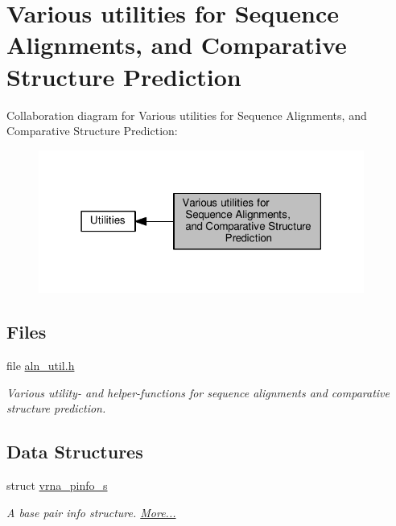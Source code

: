\hypertarget{group__aln__utils}{}\section{Various utilities for Sequence Alignments, and Comparative Structure Prediction}
\label{group__aln__utils}
Collaboration diagram for Various utilities for Sequence Alignments, and Comparative Structure Prediction\+:
\nopagebreak
\begin{figure}[H]
\begin{center}
\leavevmode
\includegraphics[width=303pt]{group__aln__utils}
\end{center}
\end{figure}
\subsection*{Files}
\begin{DoxyCompactItemize}
\item 
file \hyperlink{aln__util_8h}{aln\+\_\+util.\+h}
\begin{DoxyCompactList}\small\item\em Various utility-\/ and helper-\/functions for sequence alignments and comparative structure prediction. \end{DoxyCompactList}\end{DoxyCompactItemize}
\subsection*{Data Structures}
\begin{DoxyCompactItemize}
\item 
struct \hyperlink{group__aln__utils_structvrna__pinfo__s}{vrna\+\_\+pinfo\+\_\+s}
\begin{DoxyCompactList}\small\item\em A base pair info structure.  \hyperlink{group__aln__utils_structvrna__pinfo__s}{More...}\end{DoxyCompactList}\end{DoxyCompactItemize}
